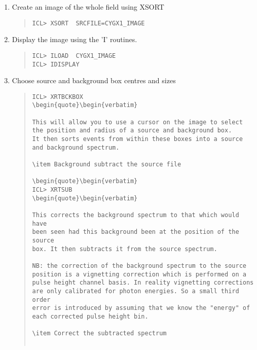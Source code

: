 \documentclass{book}
\renewcommand{\_}{{\tt\char'137}}     %
\begin{document}
\begin{enumerate}
\item Create an image of the whole field using XSORT
\begin{quote}\begin{verbatim}
ICL> XSORT  SRCFILE=CYGX1_IMAGE
\end{verbatim}\end{quote}
\item Display the image using the 'I' routines.
\begin{quote}\begin{verbatim}
ICL> ILOAD  CYGX1_IMAGE
ICL> IDISPLAY
\end{verbatim}\end{quote}
\item Choose source and background box centres and sizes
\begin{quote}\begin{verbatim}
ICL> XRTBCKBOX
\begin{quote}\begin{verbatim}
 
This will allow you to use a cursor on the image to select
the position and radius of a source and background box.
It then sorts events from within these boxes into a source
and background spectrum.
 
\item Background subtract the source file
 
\begin{quote}\begin{verbatim}
ICL> XRTSUB
\begin{quote}\begin{verbatim}
 
This corrects the background spectrum to that which would have
been seen had this background been at the position of the source
box. It then subtracts it from the source spectrum.
 
NB: the correction of the background spectrum to the source
position is a vignetting correction which is performed on a
pulse height channel basis. In reality vignetting corrections
are only calibrated for photon energies. So a small third order
error is introduced by assuming that we know the "energy" of
each corrected pulse height bin.
 
\item Correct the subtracted spectrum
 

\end{verbatim}
\end{quote}
\end{enumerate}
\end{document}
